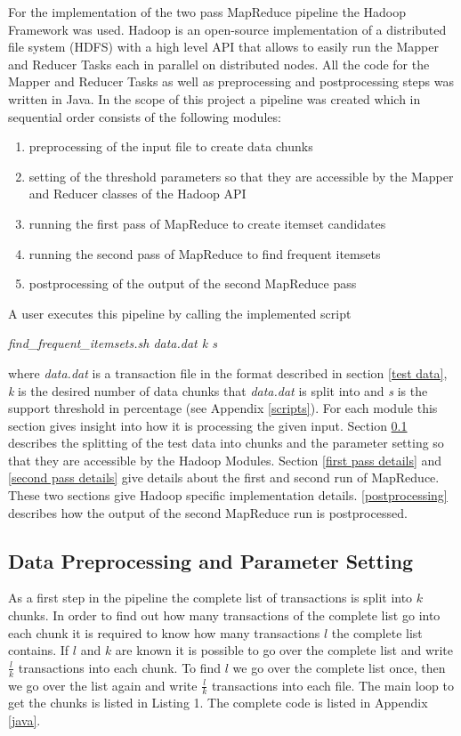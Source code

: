 For the implementation of the two pass MapReduce pipeline the Hadoop Framework was used. Hadoop is an open-source implementation of a distributed file system (HDFS) with a high level API that allows to easily run the Mapper and Reducer Tasks each in parallel on distributed nodes. All the code for the Mapper and Reducer Tasks as well as preprocessing and postprocessing steps was written in Java. In the scope of this project a pipeline was created which in sequential order consists of the following modules:
\begin{enumerate}
\item preprocessing of the input file to create data chunks 
\item setting of the threshold parameters so that they are accessible by the Mapper and Reducer classes of the Hadoop API
\item running the first pass of MapReduce to create itemset candidates
\item running the second pass of MapReduce to find frequent itemsets
\item postprocessing of the output of the second MapReduce pass
\end{enumerate}
A user executes this pipeline by calling the implemented script
\begin{center}
\textit{find\_frequent\_itemsets.sh data.dat k s}
\end{center}
where \textit{data.dat} is a transaction file in the format described in section \ref{test data}, \textit{k} is the desired number of data chunks that \textit{data.dat} is split into and \textit{s} is the support threshold in percentage (see Appendix \ref{scripts}).
For each module this section gives insight into how it is processing the given input. Section \ref{preprocessing} describes the splitting of the test data into chunks and the parameter setting so that they are accessible by the Hadoop Modules. Section \ref{first pass details} and \ref{second pass details} give details about the first and second run of MapReduce. These two sections give Hadoop specific implementation details. \ref{postprocessing} describes how the output of the second MapReduce run is postprocessed.

\subsection{Data Preprocessing and Parameter Setting}\label{preprocessing}
As a first step in the pipeline the complete list of transactions is split into $k$ chunks. In order to find out how many transactions of the complete list go into each chunk it is required to know how many transactions $l$ the complete list contains. If $l$ and $k$ are known it is possible to go over the complete list and write $\frac{l}{k}$ transactions into each chunk. To find $l$ we go over the complete list once, then we go over the list again and write $\frac{l}{k}$ transactions into each file. The main loop to get the chunks is listed in Listing 1. The complete code is listed in Appendix \ref{java}.

